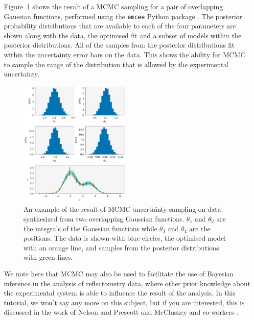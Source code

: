 \documentclass[
 reprint,
 superscriptaddress,
 amsmath,amssymb,
 aps,
]{revtex4-1}
\begin{document}
Figure~\ref{fig:mcmc} shows the result of a MCMC sampling for a pair of overlapping Gaussian functions, performed using the \texttt{emcee} Python package \cite{foremanmackey_emcee_2012}.
The posterior probability distributions that are available to each of the four parameters are shown along with the data, the optimised fit and a subset of models within the posterior distributions.
All of the samples from the posterior distributions fit within the uncertainty error bars on the data.
This shows the ability for MCMC to sample the range of the distribution that is allowed by the experimental uncertainty.
%
\begin{figure}[t]
    \includegraphics[width=0.49\textwidth]{mcmc}
    \caption{An example of the result of MCMC uncertainty sampling on data synthesized from two overlapping Gaussian functions. $\theta_1$ and $\theta_2$ are the integrals of the Gaussian functions while $\theta_3$ and $\theta_4$ are the positions. The data is shown with blue circles, the optimised model with an orange line, and samples from the posterior distributions with green lines.}
    \label{fig:mcmc}
\end{figure}
%

We note here that MCMC may also be used to facilitate the use of Bayesian inference in the analysis of reflectometry data, where other prior knowledge about the experimental system is able to influence the result of the analysis.
In this tutorial, we won't say any more on this subject, but if you are interested, this is discussed in the work of Nelson and Prescott \cite{nelson_refnx_2019} and McCluskey and co-workers \cite{mccluskey_general_2020}.
\end{document}
